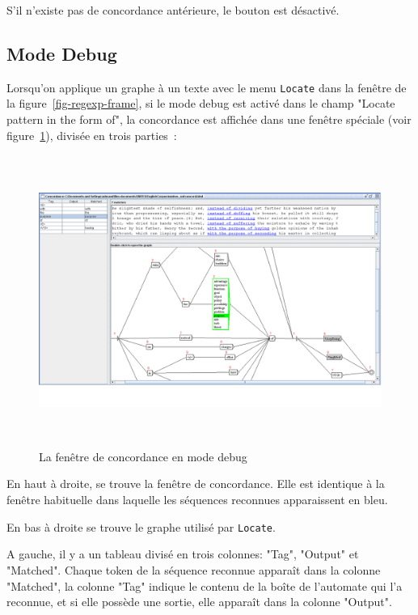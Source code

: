 \bigskip
\noindent S'il n'existe pas de concordance antérieure, le bouton est désactivé.

\subsection{Mode Debug}
\label{section-debug-mode}
Lorsqu'on applique un graphe à un texte avec le menu \verb+Locate+ dans la fenêtre de la
figure~\ref{fig-regexp-frame}, si le mode debug est activé dans le champ "Locate pattern in the
form of", la concordance est affichée dans une fenêtre spéciale (voir figure~\ref{fig-debug-mode}),
divisée en trois parties~:

\begin{figure}[!ht]
\begin{center}
\includegraphics[height=9.5cm]{resources/img/fig6-34.png}
\caption{La fenêtre de concordance en mode debug\label{fig-debug-mode}}
\end{center}
\end{figure}

\medskip 
\indent En haut à droite, se trouve la fenêtre de concordance. Elle est identique à la fenêtre habituelle dans laquelle les séquences reconnues apparaissent en bleu.

\medskip
\indent En bas à droite se trouve le graphe utilisé par \verb+Locate+.

\medskip
\indent A gauche, il y a un tableau divisé en trois colonnes: "Tag", "Output" et "Matched".
Chaque token de la séquence reconnue apparaît dans la colonne "Matched", la colonne "Tag" indique le
contenu de la boîte de l'automate qui l'a reconnue, et si elle possède une sortie, elle apparaît
dans la colonne "Output".

